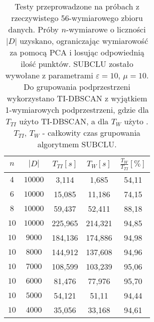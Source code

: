 \begin{table}
	\centering
	\begin{tabular}{c | c | c | c | c |}
		$ n $ & $ |D| $ & $ T_{TI} [s]$ & $ T_{W} [s]$ & $ \frac{T_{W}}{T_{TI}} [\%] $ \\ \hline
		$ 4 $  & $ 10000 $	& 3,114 	& 1,685    & 54,11 \\ \hline
		$ 6 $  & $ 10000 $	& 15,085 	& 11,186   & 74,15 \\ \hline
		$ 8 $  & $ 10000 $	& 59,437 	& 52,411 	 & 88,18 \\ \hline
		$ 10 $ & $ 10000 $  & 225,965 & 214,321  & 94,85 \\ \hline
		$ 10 $ & $ 9000 $ 	& 184,136 & 174,886  & 94,98 \\ \hline
		$ 10 $ & $ 8000 $ 	& 144,912 & 137,608  & 94,96 \\ \hline
		$ 10 $ & $ 7000 $ 	& 108,599 & 103,239  & 95,06 \\ \hline
		$ 10 $ & $ 6000 $ 	& 81,476 	& 77,976 	 & 95,70 \\ \hline
		$ 10 $ & $ 5000 $ 	& 54,121 	& 51,11 	 & 94,44 \\ \hline
		$ 10 $ & $ 4000 $ 	& 35,056 	& 33,168 	 & 94,61 \\ \hline




	\end{tabular}
	\caption{Testy przeprowadzone na próbach z rzeczywistego 56-wymiarowego zbioru danych. Próby $ n $-wymiarowe o liczności $ |D| $ uzyskano, ograniczając wymiarowość za pomocą PCA i losując odpowiednią ilość punktów. SUBCLU zostało wywołane z parametrami $ \varepsilon=10 $, $ \mu=10 $. Do grupowania podprzestrzeni wykorzystano TI-DBSCAN z wyjątkiem 1-wymiarowych podprzestrzeni, gdzie dla $ T_{TI} $ użyto TI-DBSCAN, a dla $ T_{W} $ użyto . $ T_{TI},\,T_{W} $ - całkowity czas grupowania algorytmem SUBCLU.}\label{odc:real-test}
\end{table} 